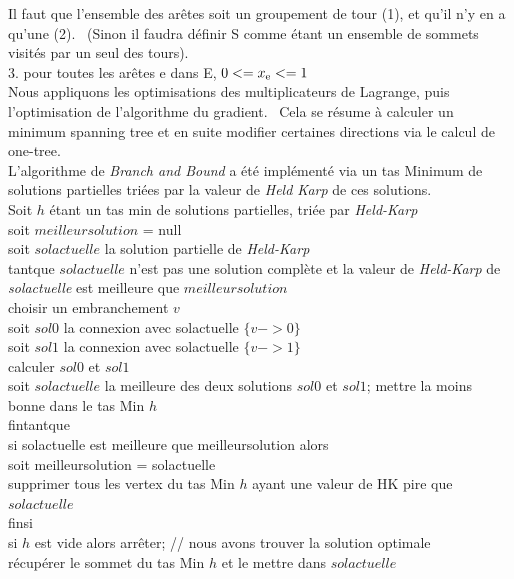 \documentclass[12pt]{report}
\begin{document}
{{{{{{{Il faut que l'ensemble des arêtes soit un groupement de tour (1), et qu'il n'y en a qu'une (2). \
(Sinon il faudra définir S comme étant un ensemble de sommets visités par un seul des tours).\\
3. pour toutes les arêtes e dans E, \(0 <= x\textsubscript{e} <= 1\) \\

Nous appliquons les optimisations des multiplicateurs de Lagrange, puis l'optimisation de l'algorithme du gradient.  \
Cela se résume à calculer un minimum spanning tree et en suite modifier certaines directions via le calcul de one-tree. \\

L'algorithme de \textit{Branch and Bound} a été implémenté via un tas Minimum de solutions partielles triées par la valeur de \textit{Held Karp} de ces solutions. \\

Soit \(h\) étant un tas min de solutions partielles, triée par \textit{Held-Karp} \\
soit \(meilleursolution\) = null \\
soit \(solactuelle\) la solution partielle de \textit{Held-Karp}\\

\indent tantque \(solactuelle\) n'est pas une solution complète et la valeur de \textit{Held-Karp} de \textit{solactuelle} est meilleure que \(meilleursolution\) \\
\indent \indent choisir un embranchement \(v\) \\
\indent \indent soit \(sol0\) la connexion avec solactuelle \(\{v -> 0\}\) \\
\indent \indent soit \(sol1\) la connexion avec solactuelle \(\{v -> 1\}\) \\
\indent \indent calculer \(sol0\) et \(sol1\) \\
\indent \indent soit \(solactuelle\) la meilleure des deux solutions \(sol0\) et \(sol1\); mettre la moins bonne dans le tas Min \(h\) \\
\indent fintantque\\
\indent si solactuelle est meilleure que meilleursolution alors\\
\indent soit meilleursolution = solactuelle \\
\indent supprimer tous les vertex du tas Min \(h\) ayant une valeur de HK pire que \(solactuelle\) \\
\indent finsi \\
\indent si \(h\) est vide alors arrêter; // nous avons trouver la solution optimale \\
\indent récupérer le sommet du tas Min \(h\) et le mettre dans \(solactuelle\)


}}}}}}}
\end{document}
